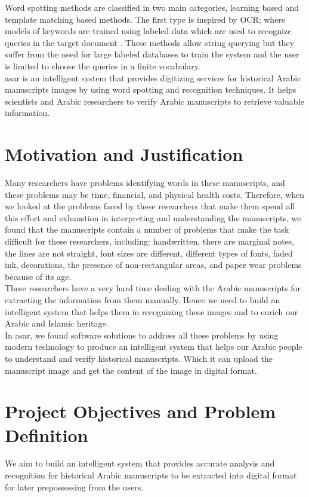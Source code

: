 Word spotting methods are classified in two main categories, learning based and template matching based methods. The first type is inspired by OCR; where models of keywords are trained using labeled data which are used to recognize queries in the target document \cite{GhilasKeyPoints}. These methods allow string querying but they suffer from the need for large labeled databases to train the system and the user is limited to choose the queries in a finite vocabulary. \\

\acrfull{asar} is an intelligent system that provides digitizing services for historical Arabic manuscripts images by using word spotting and recognition techniques. It helps scientists and Arabic researchers to verify Arabic manuscripts to retrieve valuable information.

\section{Motivation and Justification}
Many researchers have problems identifying words in these manuscripts, and these problems may be time, financial, and physical health costs. Therefore, when we looked at the problems faced by these researchers that make them spend all this effort and exhaustion in interpreting and understanding the manuscripts, we found that the manuscripts contain a number of problems that make the task difficult for these researchers, including: handwritten, there are marginal notes, the lines are not straight, font sizes are different, different types of fonts, faded ink, decorations, the presence of non-rectangular areas, and paper wear problems because of its age. \\

\noindent
These researchers have a very hard time dealing with the Arabic manuscripts for extracting the information from them manually. Hence we need to build an intelligent system that helps them in recognizing these images and to enrich our Arabic and Islamic heritage. \\

\noindent
In \acrshort{asar}, we found software solutions to address all these problems by using modern technology to produce an intelligent system that helps our Arabic people to understand and verify historical manuscripts. Which it can upload the manuscript image and get the content of the image in digital format.


\section{Project Objectives and Problem Definition}
We aim to build an intelligent system that provides accurate analysis and recognition for historical Arabic manuscripts to be extracted into digital format for later prepossessing from the users. \\

